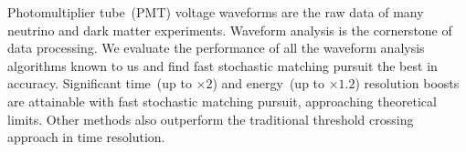 Photomultiplier tube~(PMT) voltage waveforms are the raw data of many neutrino and dark matter experiments. Waveform analysis is the cornerstone of data processing. We evaluate the performance of all the waveform analysis algorithms known to us and find fast stochastic matching pursuit the best in accuracy. Significant time~(up to $\times 2$) and energy~(up to $\times 1.2$) resolution boosts are attainable with fast stochastic matching pursuit, approaching theoretical limits.  Other methods also outperform the traditional threshold crossing approach in time resolution.
